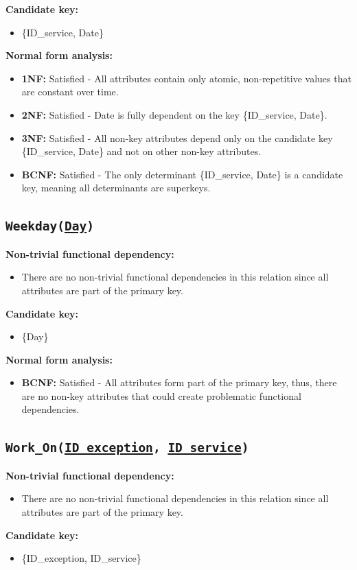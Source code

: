 \documentclass[a4paper, 12pt]{article}
\begin{document}
\textbf{Candidate key:}
\begin{itemize}
    \item \{ID\_service, Date\}
\end{itemize}

\textbf{Normal form analysis:}
\begin{itemize}
    \item \textbf{1NF:} Satisfied - All attributes contain only atomic, non-repetitive values that are constant over time.
    
    \item \textbf{2NF:} Satisfied - Date is fully dependent on the key \{ID\_service, Date\}.
    
    \item \textbf{3NF:} Satisfied - All non-key attributes depend only on the candidate key \{ID\_service, Date\} and not on other non-key attributes.
    
    \item \textbf{BCNF:} Satisfied - The only determinant \{ID\_service, Date\} is a candidate key, meaning all determinants are superkeys.
\end{itemize}

\subsection{\texttt{{Weekday}(\underline{Day})}}
\textbf{Non-trivial functional dependency:}
\begin{itemize}
    \item There are no non-trivial functional dependencies in this relation since all attributes are part of the primary key.
\end{itemize}
\textbf{Candidate key:}
\begin{itemize}
    \item \{Day\}
\end{itemize}

\textbf{Normal form analysis:}
\begin{itemize}
    \item \textbf{BCNF:} Satisfied -  All attributes form part of the primary key, thus, there are no non-key attributes that could create problematic functional dependencies.
\end{itemize}
\subsection{\texttt{{Work\_On}(\underline{ID\_exception}, \underline{ID\_service})}}
\textbf{Non-trivial functional dependency:}
\begin{itemize}
    \item There are no non-trivial functional dependencies in this relation since all attributes are part of the primary key.
\end{itemize}
\textbf{Candidate key:}
\begin{itemize}
    \item \{ID\_exception, ID\_service\}
\end{itemize}
\end{document}
